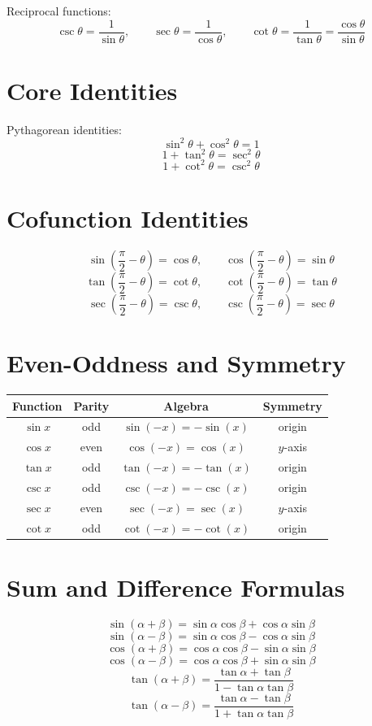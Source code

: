 \documentclass[11pt]{article}
\begin{document}
Reciprocal functions:
\[
\csc\theta=\frac{1}{\sin\theta},\qquad
\sec\theta=\frac{1}{\cos\theta},\qquad
\cot\theta=\frac{1}{\tan\theta}=\frac{\cos\theta}{\sin\theta}
\]

\section*{Core Identities}
Pythagorean identities:
\[
\sin^2\theta+\cos^2\theta=1
\]
\[
1+\tan^2\theta=\sec^2\theta
\]
\[
1+\cot^2\theta=\csc^2\theta
\]

\section*{Cofunction Identities}
\[
\sin\left(\frac{\pi}{2}-\theta\right)=\cos\theta,\qquad
\cos\left(\frac{\pi}{2}-\theta\right)=\sin\theta
\]
\[
\tan\left(\frac{\pi}{2}-\theta\right)=\cot\theta,\qquad
\cot\left(\frac{\pi}{2}-\theta\right)=\tan\theta
\]
\[
\sec\left(\frac{\pi}{2}-\theta\right)=\csc\theta,\qquad
\csc\left(\frac{\pi}{2}-\theta\right)=\sec\theta
\]

\section*{Even-Oddness and Symmetry}
\begin{center}
\begin{tabular}{cccc}
\toprule
Function & Parity & Algebra & Symmetry \\
\midrule
$\sin x$ & odd & $\sin(-x)=-\sin(x)$ & origin \\
$\cos x$ & even & $\cos(-x)=\cos(x)$ & $y$-axis \\
$\tan x$ & odd & $\tan(-x)=-\tan(x)$ & origin \\
$\csc x$ & odd & $\csc(-x)=-\csc(x)$ & origin \\
$\sec x$ & even & $\sec(-x)=\sec(x)$ & $y$-axis \\
$\cot x$ & odd & $\cot(-x)=-\cot(x)$ & origin \\
\bottomrule
\end{tabular}
\end{center}

\section*{Sum and Difference Formulas}
\[
\sin(\alpha+\beta)=\sin\alpha\cos\beta+\cos\alpha\sin\beta
\]
\[
\sin(\alpha-\beta)=\sin\alpha\cos\beta-\cos\alpha\sin\beta
\]
\[
\cos(\alpha+\beta)=\cos\alpha\cos\beta-\sin\alpha\sin\beta
\]
\[
\cos(\alpha-\beta)=\cos\alpha\cos\beta+\sin\alpha\sin\beta
\]
\[
\tan(\alpha+\beta)=\frac{\tan\alpha+\tan\beta}{1-\tan\alpha\tan\beta}
\]
\[
\tan(\alpha-\beta)=\frac{\tan\alpha-\tan\beta}{1+\tan\alpha\tan\beta}
\]
\end{document}
